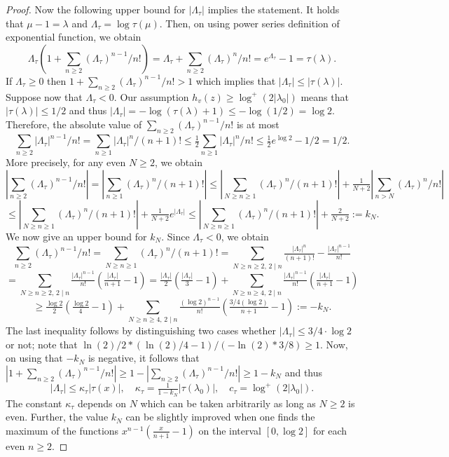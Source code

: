 \begin{proof}
Now the following upper bound for $|\Lambda_\tau|$ implies the statement.
It holds that $\mu-1=\lambda$ and $\Lambda_\tau=\log \tau (\mu)$. Then, on using power series definition of exponential function, we obtain $$\Lambda_\tau(1+\sum_{n\geq 2} (\Lambda_\tau)^{n-1}/n!)=\Lambda_\tau+\sum_{n\geq 2} (\Lambda_\tau)^n/n!=e^{\Lambda_\tau}-1=\tau(\lambda).$$
If $\Lambda_\tau\geq 0$ then $1+\sum_{n\geq 2} (\Lambda_\tau)^{n-1}/n!>1$ which implies that $|\Lambda_\tau|\leq |\tau(\lambda)|.$ Suppose now that $\Lambda_\tau<0$. Our assumption $h_v(z)\geq \log^+ (2|\lambda_0|)$ means that $|\tau(\lambda)|\leq 1/2$ and thus $|\Lambda_\tau|=-\log (\tau(\lambda)+1)\leq -\log(1/2)=\log 2.$ Therefore, the absolute value of $\sum_{n\geq 2} (\Lambda_\tau)^{n-1}/n!$ is at most $$\sum_{n\geq 2} |\Lambda_\tau|^{n-1}/n!=\sum_{n\geq 1} |\Lambda_\tau|^{n}/(n+1)!\leq \tfrac{1}{2}\sum_{n\geq 1} |\Lambda_\tau|^{n}/n!\leq
\tfrac{1}{2}e^{\log 2}-1/2=1/2.$$
More precisely, for any even $N\geq 2$, we obtain 
$$|\sum_{n\geq 2} (\Lambda_\tau)^{n-1}/n!|=|\sum_{n\geq 1} (\Lambda_\tau)^{n}/(n+1)!|\leq |\sum_{N\geq n\geq 1} (\Lambda_\tau)^{n}/(n+1)!|+\tfrac{1}{N+2}|\sum_{n>N} (\Lambda_\tau)^{n}/n!|$$
$$\leq |\sum_{N\geq n\geq 1} (\Lambda_\tau)^{n}/(n+1)!|+\tfrac{1}{N+2}e^{|\Lambda_\tau|}\leq |\sum_{N\geq n\geq 1} (\Lambda_\tau)^{n}/(n+1)!|+\tfrac{2}{N+2}:=k_N.$$
We now give an upper bound for $k_N$. Since $\Lambda_\tau<0$, we obtain
$$\sum_{n\geq 2} (\Lambda_\tau)^{n-1}/n!=\sum_{N\geq n\geq 1} (\Lambda_\tau)^{n}/(n+1)!=\sum_{N\geq n\geq 2, \, 2\mid n}\tfrac{|\Lambda_\tau|^n}{(n+1)!}-\tfrac{|\Lambda_\tau|^{n-1}}{n!}$$
$$=\sum_{N\geq n\geq 2, \, 2\mid n}\tfrac{|\Lambda_\tau|^{n-1}}{n!}(\tfrac{|\Lambda_\tau|}{n+1}-1)=\tfrac{|\Lambda_\tau|}{2}(\tfrac{|\Lambda_\tau|}{3}-1)+\sum_{N\geq n\geq 4, \, 2\mid n}\tfrac{|\Lambda_\tau|^{n-1}}{n!}(\tfrac{|\Lambda_\tau|}{n+1}-1)$$
$$\geq \tfrac{\log 2}{2}(\tfrac{\log 2}{4}-1)+\sum_{N\geq n\geq 4, \, 2\mid n}\tfrac{(\log 2)^{n-1}}{n!}(\tfrac{3/4(\log 2)}{n+1}-1):=-k_N.$$
The last inequality follows by distinguishing two cases whether  $|\Lambda_\tau|\leq 3/4\cdot \log 2$ or not; note that $\ln(2)/2*(\ln(2)/4-1)/(-\ln (2)*3/8)\geq 1$.  Now, on using that $-k_N$ is negative, it follows that $|1+\sum_{n\geq 2} (\Lambda_\tau)^{n-1}/n!|\geq 1-|\sum_{n\geq 2} (\Lambda_\tau)^{n-1}/n!|\geq 1-k_N$ and thus 
$$|\Lambda_\tau|\leq \kappa_\tau|\tau(x)|, \quad \kappa_\tau=\tfrac{1}{1-k_N}|\tau(\lambda_0)|,  \quad c_\tau=\log^+(2|\lambda_0|).$$
The constant $\kappa_\tau$ depends on $N$ which can be taken arbitrarily as long as $N\geq 2$ is even. Further, the value $k_N$ can be slightly improved when one finds the maximum of the functions $x^{n-1}(\tfrac{x}{n+1}-1)$ on the interval $[0,\log 2]$ for each even $n\geq 2$.


\end{proof}

